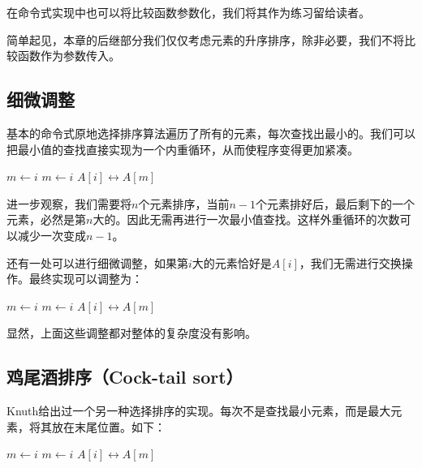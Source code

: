 \documentclass[b5paper]{ctexart}
\begin{document}
在命令式实现中也可以将比较函数参数化，我们将其作为练习留给读者。

简单起见，本章的后继部分我们仅仅考虑元素的升序排序，除非必要，我们不将比较函数作为参数传入。

\subsection{细微调整}

基本的命令式原地选择排序算法遍历了所有的元素，每次查找出最小的。我们可以把最小值的查找直接实现为一个内重循环，从而使程序变得更加紧凑。

\begin{algorithmic}[1]
    \State $m \gets i$
        \State $m \gets i$
      \EndIf
    \EndFor
    \State {} $A[i] \leftrightarrow A[m]$
  \EndFor
\EndProcedure
\end{algorithmic}

进一步观察，我们需要将$n$个元素排序，当前$n-1$个元素排好后，最后剩下的一个元素，必然是第$n$大的。因此无需再进行一次最小值查找。这样外重循环的次数可以减少一次变成$n-1$。

还有一处可以进行细微调整，如果第$i$大的元素恰好是$A[i]$，我们无需进行交换操作。最终实现可以调整为：

\begin{algorithmic}[1]
    \State $m \gets i$
        \State $m \gets i$
      \EndIf
    \EndFor
      \State {} $A[i] \leftrightarrow A[m]$
    \EndIf
  \EndFor
\EndProcedure
\end{algorithmic}

显然，上面这些调整都对整体的复杂度没有影响。

\subsection{鸡尾酒排序（Cock-tail sort）}

Knuth给出过一个另一种选择排序的实现\cite{TAOCP}。每次不是查找最小元素，而是最大元素，将其放在末尾位置。如下：

\begin{algorithmic}[1]
    \State $m \gets i$
        \State $m \gets i$
      \EndIf
    \EndFor
    \State {} $A[i] \leftrightarrow A[m]$
  \EndFor
\EndProcedure
\end{algorithmic}
\end{document}
